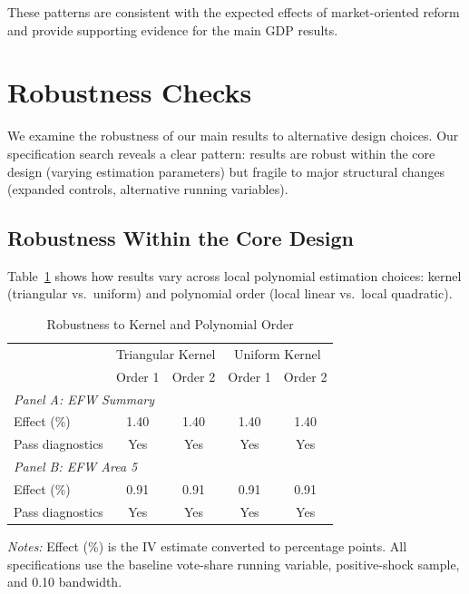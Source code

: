 \documentclass[12pt,a4paper]{article}
\begin{document}
These patterns are consistent with the expected effects of market-oriented 
reform and provide supporting evidence for the main GDP results.


\section{Robustness Checks}
\label{sec:robustness}

We examine the robustness of our main results to alternative design choices. 
Our specification search reveals a clear pattern: results are robust within 
the core design (varying estimation parameters) but fragile to major 
structural changes (expanded controls, alternative running variables).

\subsection{Robustness Within the Core Design}

Table~\ref{tab:robustness_estimation} shows how results vary across 
local polynomial estimation choices: kernel (triangular vs.\ uniform) 
and polynomial order (local linear vs.\ local quadratic).

\begin{table}[H]
\centering
\caption{Robustness to Kernel and Polynomial Order}
\label{tab:robustness_estimation}
\begin{threeparttable}
\begin{tabular}{lcccc}
\toprule
 & \multicolumn{2}{c}{Triangular Kernel} & \multicolumn{2}{c}{Uniform Kernel} \\
 & Order 1 & Order 2 & Order 1 & Order 2 \\
\midrule
\multicolumn{5}{l}{\textit{Panel A: EFW Summary}} \\
Effect (\%) & 1.40 & 1.40 & 1.40 & 1.40 \\
Pass diagnostics & Yes & Yes & Yes & Yes \\
\midrule
\multicolumn{5}{l}{\textit{Panel B: EFW Area 5}} \\
Effect (\%) & 0.91 & 0.91 & 0.91 & 0.91 \\
Pass diagnostics & Yes & Yes & Yes & Yes \\
\bottomrule
\end{tabular}
\begin{tablenotes}
\small
\item \textit{Notes:} Effect (\%) is the IV estimate converted to percentage 
points. All specifications use the baseline vote-share running variable, 
positive-shock sample, and 0.10 bandwidth.
\end{tablenotes}
\end{threeparttable}
\end{table}
\end{document}
